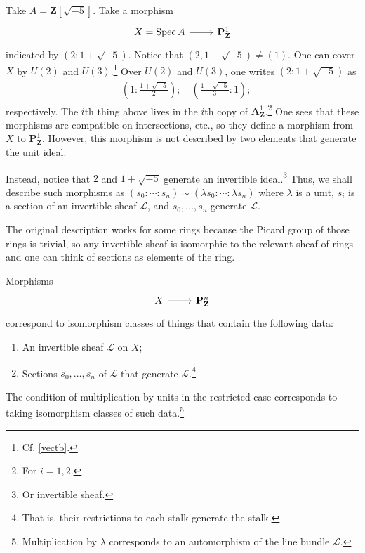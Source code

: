 \documentclass [11 pt, oneside] {article}
\begin{document}
\begin{example}\label{}\text{}
Take $A= \mathbf{Z}[\sqrt{-5}]$. Take a morphism
\[
\begin{tikzcd}
	X = \Spec A\ar[r] &\mathbf{P}^1_\mathbf{Z}
\end{tikzcd}
\]
indicated by $(2:1+\sqrt{-5} )$. Notice that $(2,1+\sqrt{-5} ) \ne (1)$. One can cover $X$ by $U(2)$ and $U(3)$.\footnote{Cf. \cref{vectb}.} Over $U(2)$ and $U(3)$, one writes $(2:1+\sqrt{-5} )$ as 
\begin{align*}
	& \left( 1:\frac{1+\sqrt{-5} }{2} \right); \quad \left( \frac{1-\sqrt{-5} }{3}: 1\right); 
\end{align*}
respectively. The $i$th thing above lives in the $i$th copy of $\mathbf{A}^1_\mathbf{Z}$.\footnote{For $i=1,2$.}
One sees that these morphisms are compatible on intersections, etc., so they define a morphism from $X$ to $\mathbf{P}^1_\mathbf{Z}$. However, this morphism is not described by two elements \ul{that generate the unit ideal}.

Instead, notice that $2$ and $1+\sqrt{-5}$ generate an invertible ideal.\footnote{Or invertible sheaf.} Thus, we shall describe such morphisms as $(s_0:\cdots:s_n)\sim(\lambda s_0:\cdots:\lambda s_n)$ where $\lambda$ is a unit, $s_i$ is a section of an invertible sheaf $\mathscr{L}$, and $s_0,\hdots, s_n$ generate $\mathscr{L}$. 
\end{example}

\begin{remark}
	The original description works for some rings because the Picard group of those rings is trivial, so any invertible sheaf is isomorphic to the relevant sheaf of rings and one can think of sections as elements of the ring.
\end{remark}

Morphisms
\[
\begin{tikzcd}
	X\ar[r]&\mathbf{P}^n_\mathbf{Z}
\end{tikzcd}
\]
correspond to isomorphism classes of things that contain the following data:
\begin{enumerate}
	\item An invertible sheaf $\mathscr{L}$ on $X$;
	\item Sections $s_0,\hdots, s_n$ of $\mathscr{L}$ that generate $\mathscr{L}$.\footnote{That is, their restrictions to each stalk generate the stalk.}
\end{enumerate}
The condition of multiplication by units in the restricted case corresponds to taking isomorphism classes of such data.\footnote{Multiplication by $\lambda$ corresponds to an automorphism of the line bundle $\mathscr{L}$.}
\end{document}
